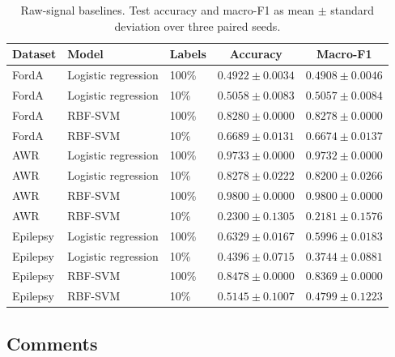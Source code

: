 \documentclass[a4paper,11pt]{article}
\begin{document}
\begin{table}[htbp]
    \centering
    \small
    \begin{tabular}{l l l c c}
        \toprule
        Dataset & Model & Labels & Accuracy & Macro-F1 \\
        \midrule
        FordA & Logistic regression & 100\% & $0.4922 \pm 0.0034$ & $0.4908 \pm 0.0046$ \\
        FordA & Logistic regression & 10\%  & $0.5058 \pm 0.0083$ & $0.5057 \pm 0.0084$ \\
        FordA & RBF-SVM             & 100\% & $0.8280 \pm 0.0000$ & $0.8278 \pm 0.0000$ \\
        FordA & RBF-SVM             & 10\%  & $0.6689 \pm 0.0131$ & $0.6674 \pm 0.0137$ \\
        \midrule
        AWR & Logistic regression & 100\% & $0.9733 \pm 0.0000$ & $0.9732 \pm 0.0000$ \\
        AWR & Logistic regression & 10\%  & $0.8278 \pm 0.0222$ & $0.8200 \pm 0.0266$ \\
        AWR & RBF-SVM             & 100\% & $0.9800 \pm 0.0000$ & $0.9800 \pm 0.0000$ \\
        AWR & RBF-SVM             & 10\%  & $0.2300 \pm 0.1305$ & $0.2181 \pm 0.1576$ \\
        \midrule
        Epilepsy & Logistic regression & 100\% & $0.6329 \pm 0.0167$ & $0.5996 \pm 0.0183$ \\
        Epilepsy & Logistic regression & 10\%  & $0.4396 \pm 0.0715$ & $0.3744 \pm 0.0881$ \\
        Epilepsy & RBF-SVM             & 100\% & $0.8478 \pm 0.0000$ & $0.8369 \pm 0.0000$ \\
        Epilepsy & RBF-SVM             & 10\%  & $0.5145 \pm 0.1007$ & $0.4799 \pm 0.1223$ \\
        \bottomrule
    \end{tabular}
    \caption{Raw-signal baselines. Test accuracy and macro-F1 as mean $\pm$ standard deviation over three paired seeds.}
    \label{tab:baselines}
\end{table}

\subsection{Comments}
\end{document}
